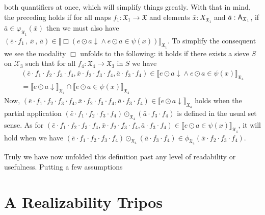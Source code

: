 \documentclass[11pt]{article}
\begin{document}
both quantifiers at once, which will simplify things greatly. With that in mind,
the preceding holds if for all maps
\(f_{1} : \mathfrak{X}_{1} \to \mathfrak{X}\) and elements
\(\bar{x} : X_{\mathfrak{X}_{1}}\) and \(\bar{a} : \mathsf{A}_{\mathfrak{X}_{1}}\), if
\( \bar{a} \in \varphi_{\mathfrak{X}_{1}}(\bar{x}) \) then we must also have
\(
 (\bar{e} \cdot f_{1}\,,\,\bar{x}\,,\,\bar{a}) \in \llbracket
    \Box ({e \odot a \downarrow} \land e \odot a \in \psi(x))
  \rrbracket_{\mathfrak{X}_{1}}
\).
To simplify the consequent we see the modality \(\Box\) unfolds to the following:
it holds if there exists a sieve \(S\) on \(\mathcal{X}_{3}\) such that for all
\(f_{4} : \mathfrak{X}_{4} \to \mathfrak{X}_{3}\) in \(S\) we have
\begin{multline*}
 (\bar{e} \cdot f_{1}\cdot f_{2}\cdot f_{3} \cdot f_{4}, \bar{x} \cdot f_{2} \cdot f_{3} \cdot f_{4}, \bar{a} \cdot f_{3} \cdot f_{4}) \in \llbracket
    {e \odot a \downarrow} \land e \odot a \in \psi(x)
  \rrbracket_{\mathfrak{X}_{4}}
  \\
  =
  {\llbracket {e \odot a \downarrow} \rrbracket_{\mathfrak{X}_{4}}}
  \cap
  {\llbracket e \odot a \in \psi(x) \rrbracket_{\mathfrak{X}_{4}}}
\end{multline*}
Now,
\((\bar{e} \cdot f_{1}\cdot f_{2}\cdot f_{3} \cdot f_{4}, \bar{x} \cdot f_{2} \cdot f_{3} \cdot f_{4}, \bar{a} \cdot f_{3} \cdot f_{4})
\in
\llbracket {e \odot a \downarrow} \rrbracket_{\mathfrak{X}_{4}}\)
holds when the partial application
\(
(\bar{e} \cdot f_{1}\cdot f_{2}\cdot f_{3} \cdot f_{4})
\odot_{\mathfrak{X}_{4}}
(\bar{a} \cdot f_{3} \cdot f_{4})
\)
is defined in the usual set sense. As for
\(
(\bar{e} \cdot f_{1}\cdot f_{2}\cdot f_{3} \cdot f_{4}, \bar{x} \cdot f_{2} \cdot f_{3} \cdot f_{4}, \bar{a} \cdot f_{3} \cdot f_{4})
\in
{\llbracket e \odot a \in \psi(x) \rrbracket_{\mathfrak{X}_{4}}}
\),
it will hold when we have
\(
(\bar{e} \cdot f_{1}\cdot f_{2}\cdot f_{3} \cdot f_{4})
\odot_{\mathfrak{X}_{4}}
(\bar{a} \cdot f_{3} \cdot f_{4})
\in
\phi_{\mathfrak{X}_{4}}(\bar{x} \cdot f_{2} \cdot f_{3} \cdot f_{4})
\).

Truly we have now unfolded this definition past any level of readability or
usefulness. Putting a few assumptions


\section{A Realizability Tripos}

\end{document}
